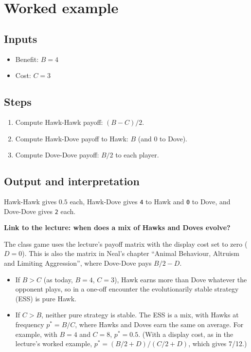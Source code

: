 \documentclass[
  a4paper]{book}
\providecommand{\tightlist}{%
  \setlength{\itemsep}{0pt}\setlength{\parskip}{0pt}}
\begin{document}
\section{Worked example}\label{worked-example-9}

\subsection{Inputs}\label{inputs-6}

\begin{itemize}
\tightlist
\item
  Benefit: \(B = 4\)
\item
  Cost: \(C = 3\)
\end{itemize}

\subsection{Steps}\label{steps-6}

\begin{enumerate}
\def\labelenumi{\arabic{enumi}.}
\tightlist
\item
  Compute Hawk-Hawk payoff: \((B-C)/2\).
\item
  Compute Hawk-Dove payoff to Hawk: \(B\) (and 0 to Dove).
\item
  Compute Dove-Dove payoff: \(B/2\) to each player.
\end{enumerate}

\subsection{Output and interpretation}\label{output-and-interpretation-6}

Hawk-Hawk gives \(0.5\) each, Hawk-Dove gives \texttt{4} to Hawk and \texttt{0} to Dove, and Dove-Dove gives \texttt{2} each.

\textbf{Link to the lecture: when does a mix of Hawks and Doves evolve?}

The class game uses the lecture's payoff matrix with the display cost set to zero (\(D = 0\)). This is also the matrix in Neal's chapter ``Animal Behaviour, Altruism and Limiting Aggression'', where Dove-Dove pays \(B/2 - D\).

\begin{itemize}
\tightlist
\item
  If \(B > C\) (as today, \(B = 4\), \(C = 3\)), Hawk earns more than Dove whatever the opponent plays, so in a one-off encounter the evolutionarily stable strategy (ESS) is pure Hawk.
\item
  If \(C > B\), neither pure strategy is stable. The ESS is a mix, with Hawks at frequency \(p^* = B/C\), where Hawks and Doves earn the same on average. For example, with \(B = 4\) and \(C = 8\), \(p^* = 0.5\). (With a display cost, as in the lecture's worked example, \(p^* = (B/2 + D)/(C/2 + D)\), which gives 7/12.)
\end{itemize}
\end{document}
